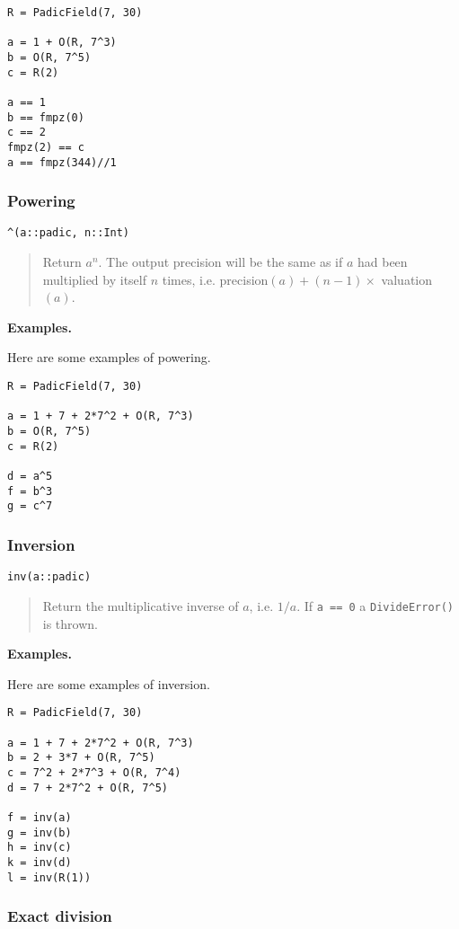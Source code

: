 \documentclass[a4paper,10pt]{article}
\newcommand{\code}{\lstinline}
\newcommand{\desc}[1]{\vspace{-3mm}\begin{quote}#1\end{quote}}
\begin{document}
{{\begin{lstlisting}
R = PadicField(7, 30)

a = 1 + O(R, 7^3)
b = O(R, 7^5)
c = R(2)

a == 1
b == fmpz(0)
c == 2
fmpz(2) == c
a == fmpz(344)//1
\end{lstlisting}

\subsubsection{Powering}

\begin{lstlisting}
^(a::padic, n::Int)
\end{lstlisting}

\desc{Return $a^n$. The output precision will be the same as if $a$ had been
multiplied by itself $n$ times, i.e. precision$(a) + (n - 1)\times$
valuation$(a)$.}

\textbf{Examples.}

Here are some examples of powering.

\begin{lstlisting}
R = PadicField(7, 30)

a = 1 + 7 + 2*7^2 + O(R, 7^3)
b = O(R, 7^5)
c = R(2)

d = a^5
f = b^3
g = c^7
\end{lstlisting}

\subsubsection{Inversion}

\begin{lstlisting}
inv(a::padic)
\end{lstlisting}

\desc{Return the multiplicative inverse of $a$, i.e. $1/a$. If \code{a == 0}
a \code{DivideError()} is thrown.}

\textbf{Examples.}

Here are some examples of inversion.

\begin{lstlisting}
R = PadicField(7, 30)

a = 1 + 7 + 2*7^2 + O(R, 7^3)
b = 2 + 3*7 + O(R, 7^5)
c = 7^2 + 2*7^3 + O(R, 7^4)
d = 7 + 2*7^2 + O(R, 7^5)

f = inv(a)
g = inv(b)
h = inv(c)
k = inv(d)
l = inv(R(1))
\end{lstlisting}

\subsubsection{Exact division}

}}
\end{document}
